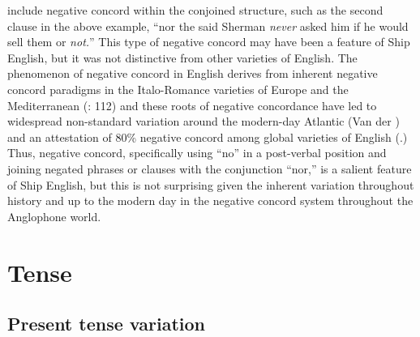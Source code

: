 include negative concord within the conjoined structure, such as the second clause in the above example, “nor the said Sherman \textit{never} asked him if he would sell them or \textit{not.}” This type of negative concord may have been a feature of Ship English, but it was not distinctive from other varieties of English. The phenomenon of negative concord in English derives from inherent negative concord paradigms in the Italo-Romance varieties of Europe and the Mediterranean (\citealt{WillisEtAl2013}: 112) and these roots of negative concordance have led to widespread non-standard variation around the modern-day Atlantic (Van der \citealt{Auwera2016}) and an attestation of 80\% negative concord among global varieties of English (\citealt{KortmannLunkenheimer2013}.) Thus, negative concord, specifically using “no” in a post-verbal position and joining negated phrases or clauses with the conjunction “nor,” is a salient feature of Ship English, but this is not surprising given the inherent variation throughout history and up to the modern day in the negative concord system throughout the Anglophone world.  

\section{\textbf{Tense}}%

\subsection{\textbf{Present} \textbf{tense} \textbf{variation} }%


